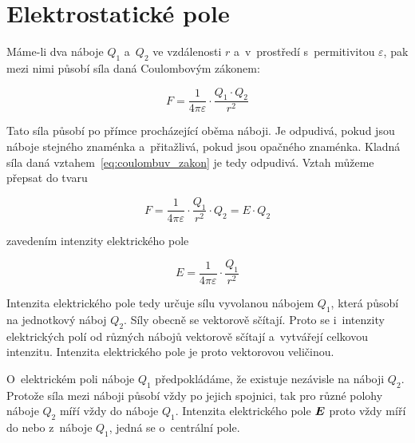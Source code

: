 \section{Elektrostatické pole}

Máme-li dva náboje \(Q_1\) a~\(Q_2\) ve vzdálenosti \(r\) a~v~prostředí s~permitivitou \(\varepsilon\), pak mezi nimi působí síla daná Coulombovým zákonem:

\begin{equation}
\label{eq:coulombuv_zakon}
F = \frac{1}{4 \pi \varepsilon} \cdot \frac{Q_1 \cdot Q_2}{r^2}
\end{equation}


Tato síla působí po přímce procházející oběma náboji. Je odpudivá, pokud jsou náboje stejného znaménka a~přitažlivá, pokud jsou opačného znaménka. Kladná síla daná vztahem~\eqref{eq:coulombuv_zakon} je tedy odpudivá. Vztah můžeme přepsat do tvaru 

\begin{equation}
F = \frac{1}{4 \pi \varepsilon} \cdot \frac{Q_1}{r^2} \cdot Q_2 = E \cdot Q_2
\end{equation}

zavedením intenzity elektrického pole

\begin{equation}
\label{eq:intenzita_elektrickeho_pole_bodoveho_naboje}
E = \frac{1}{4 \pi \varepsilon} \cdot \frac{Q_1}{r^2}
\end{equation}

Intenzita elektrického pole tedy určuje sílu vyvolanou nábojem \(Q_1\), která působí na jednotkový náboj \(Q_2\). Síly obecně se vektorově sčítají. Proto se i~intenzity elektrických polí od různých nábojů vektorově sčítají a~vytvářejí celkovou intenzitu. Intenzita elektrického pole je proto vektorovou veličinou.

O~elektrickém poli náboje \(Q_1\) předpokládáme, že existuje nezávisle na náboji \(Q_2\). Protože síla mezi náboji působí vždy po jejich spojnici, tak pro různé polohy náboje \(Q_2\) míří vždy do náboje \(Q_1\). Intenzita elektrického pole \(\boldsymbol{E}\) proto vždy míří do nebo z~náboje \(Q_1\), jedná se o~centrální pole.

